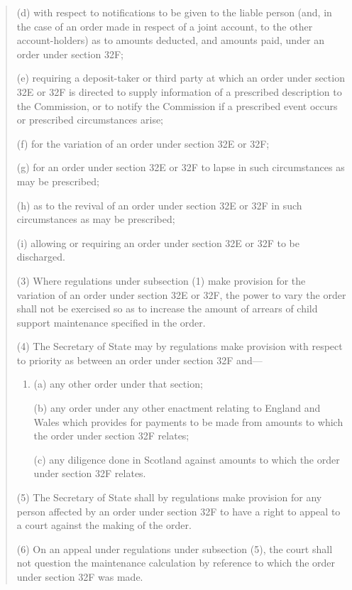 \documentclass[a4paper]{article}
\begin{document}
\begin{quotation}
\begin{enumerate}
(d) with respect to notifications to be given to the liable person (and, in the case of an order made in respect of a joint account, to the other account-holders) as to amounts deducted, and amounts paid, under an order under section 32F;

(e) requiring a deposit-taker or third party at which an order under section 32E or 32F is directed to supply information of a prescribed description to the Commission, or to notify the Commission if a prescribed event occurs or prescribed circumstances arise;

(f) for the variation of an order under section 32E or 32F;

(g) for an order under section 32E or 32F to lapse in such circumstances as may be prescribed;

(h) as to the revival of an order under section 32E or 32F in such circumstances as may be prescribed;

(i) allowing or requiring an order under section 32E or 32F to be discharged.
\end{enumerate}

(3)
Where regulations under subsection (1) make provision for the variation of an order under section 32E or 32F, the power to vary the order shall not be exercised so as to increase the amount of arrears of child support maintenance specified in the order.

(4)
The Secretary of State may by regulations make provision with respect to priority as between an order under section 32F and---
\begin{enumerate}\item[]
(a) any other order under that section;

(b) any order under any other enactment relating to England and Wales which provides for payments to be made from amounts to which the order under section 32F relates;

(c) any diligence done in Scotland against amounts to which the order under section 32F relates.
\end{enumerate}

(5)
The Secretary of State shall by regulations make provision for any person affected by an order under section 32F to have a right to appeal to a court against the making of the order.

(6)
On an appeal under regulations under subsection (5), the court shall not question the maintenance calculation by reference to which the order under section 32F was made.


\end{quotation}
\end{document}
